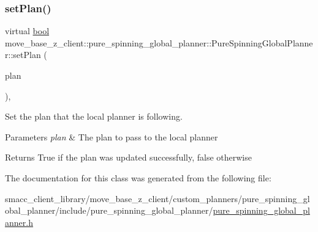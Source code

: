 \subsubsection{\texorpdfstring{set\+Plan()}{setPlan()}}
{\footnotesize\ttfamily virtual \hyperlink{classbool}{bool} move\+\_\+base\+\_\+z\+\_\+client\+::pure\+\_\+spinning\+\_\+global\+\_\+planner\+::\+Pure\+Spinning\+Global\+Planner\+::set\+Plan (\begin{DoxyParamCaption}\item[{const std\+::vector$<$ geometry\+\_\+msgs\+::\+Pose\+Stamped $>$ \&}]{plan }\end{DoxyParamCaption})\hspace{0.3cm}{\ttfamily [override]}, {\ttfamily [virtual]}}



Set the plan that the local planner is following. 


\begin{DoxyParams}{Parameters}
{\em plan} & The plan to pass to the local planner \\
\hline
\end{DoxyParams}
\begin{DoxyReturn}{Returns}
True if the plan was updated successfully, false otherwise 
\end{DoxyReturn}


The documentation for this class was generated from the following file\+:\begin{DoxyCompactItemize}
\item 
smacc\+\_\+client\+\_\+library/move\+\_\+base\+\_\+z\+\_\+client/custom\+\_\+planners/pure\+\_\+spinning\+\_\+global\+\_\+planner/include/pure\+\_\+spinning\+\_\+global\+\_\+planner/\hyperlink{pure__spinning__global__planner_8h}{pure\+\_\+spinning\+\_\+global\+\_\+planner.\+h}\end{DoxyCompactItemize}
